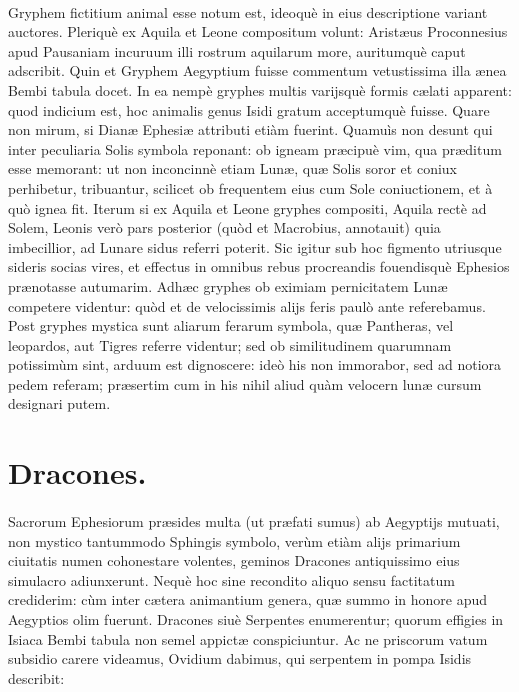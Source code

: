 \documentclass[a4paper, 11pt, oneside, polutonikogreek, latin]{article}
\begin{document}
\paragraph{}
Gryphem fictitium animal esse notum est, ideoquè in eius descriptione variant auctores. Pleriquè ex Aquila et Leone compositum volunt: Aristæus Proconnesius apud Pausaniam incuruum illi rostrum aquilarum more, auritumquè caput adscribit. Quin et Gryphem Aegyptium fuisse commentum vetustissima illa ænea Bembi tabula docet. In ea nempè gryphes multis varijsquè formis cælati apparent: quod indicium est, hoc animalis genus Isidi gratum acceptumquè fuisse. Quare non mirum, si Dianæ Ephesiæ attributi etiàm fuerint. Quamuìs non desunt qui inter peculiaria Solis symbola reponant: ob igneam præcipuè vim, qua præditum esse memorant: ut non inconcinnè etiam Lunæ, quæ Solis soror et coniux perhibetur, tribuantur, scilicet ob frequentem eius cum Sole coniuctionem, et à quò ignea fit. Iterum si ex Aquila et Leone gryphes compositi, Aquila rectè ad Solem, Leonis verò pars posterior (quòd et Macrobius, annotauit) quia imbecillior, ad Lunare sidus referri poterit. Sic igitur sub hoc figmento utriusque sideris socias vires, et effectus in omnibus rebus procreandis fouendisquè Ephesios prænotasse autumarim. Adhæc gryphes ob eximiam pernicitatem Lunæ competere videntur: quòd et de velocissimis alijs feris paulò ante referebamus. Post gryphes mystica sunt aliarum ferarum symbola, quæ Pantheras, vel leopardos, aut Tigres referre videntur; sed ob similitudinem quarumnam potissimùm sint, arduum est dignoscere: ideò his non immorabor, sed ad notiora pedem referam; præsertim cum in his nihil aliud quàm velocern lunæ cursum designari putem.
\clearpage
\section{Dracones.}
\paragraph{}
Sacrorum Ephesiorum præsides multa (ut præfati sumus) ab Aegyptijs mutuati, non mystico tantummodo Sphingis symbolo, verùm etiàm alijs primarium ciuitatis numen cohonestare volentes, geminos Dracones antiquissimo eius simulacro adiunxerunt. Nequè hoc sine recondito aliquo sensu factitatum crediderim: cùm inter cætera animantium genera, quæ summo in honore apud Aegyptios olim fuerunt. Dracones siuè Serpentes enumerentur; quorum effigies in Isiaca Bembi tabula non semel appictæ conspiciuntur. Ac ne priscorum vatum subsidio carere videamus, Ovidium dabimus, qui serpentem in pompa Isidis describit:
\end{document}
